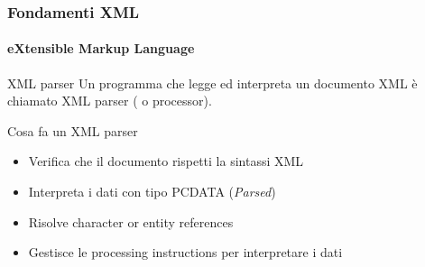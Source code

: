 


\begin{frame}
	\frametitle{Fondamenti XML}
	\framesubtitle{eXtensible Markup Language}
	\addtocounter{nframe}{1}

	\begin{block}{XML parser}
		Un programma che legge ed interpreta un documento XML è chiamato XML parser ( o processor).
	\end{block}
	\begin{block}{Cosa fa un XML parser}
		\begin{itemize}
			\item Verifica che il documento rispetti la sintassi XML
			\item Interpreta i dati con tipo PCDATA (\textit{Parsed})
			\item Risolve character or entity references
			\item Gestisce le processing instructions per interpretare i dati
		\end{itemize}
	\end{block}

\end{frame}





